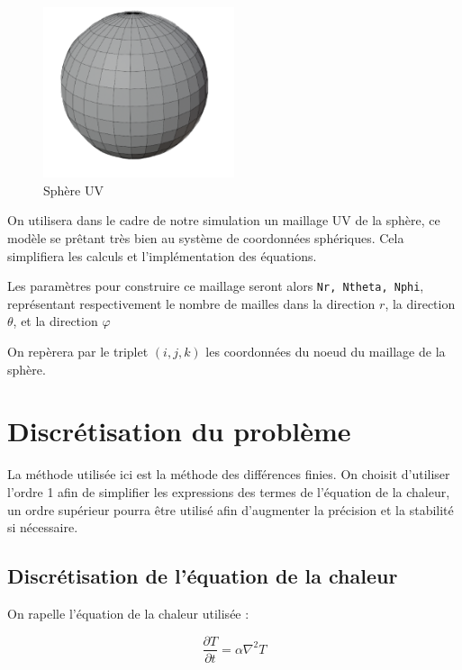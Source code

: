 \documentclass[fleqn]{article}
\renewcommand{\phi}{\varphi}
\begin{document}
\begin{center}
\begin{minipage}[b]{0.33333\textwidth}
\begin{figure}[H]
    \end{figure}
    \end{minipage}%
    \begin{minipage}[b]{0.33333\textwidth}
    \begin{figure}[H]
        \centering
        \includegraphics[width = 0.5\textwidth]{images/sphere UV.png}
        \caption[short]{Sphère UV}
    \end{figure}
    \end{minipage}
\end{center}


On utilisera dans le cadre de notre simulation un maillage UV de la sphère, ce modèle se prêtant très bien au système de coordonnées sphériques. Cela simplifiera les calculs et l'implémentation des équations.

Les paramètres pour construire ce maillage seront alors \texttt{Nr, Ntheta, Nphi}, représentant respectivement le nombre de mailles dans la direction $r$, la direction $\theta$, et la direction $\phi$ 

On repèrera par le triplet $(i,j,k)$ les coordonnées du noeud du maillage de la sphère. 

\newpage
\section{Discrétisation du problème} 
La méthode utilisée ici est la méthode des différences finies. On choisit d'utiliser l'ordre 1 afin de simplifier les expressions des termes de l'équation de la chaleur, un ordre supérieur pourra être utilisé afin d'augmenter la précision et la stabilité si nécessaire.
\subsection{Discrétisation de l'équation de la chaleur}
On rapelle l'équation de la chaleur utilisée :

\begin{equation}
    \frac{ \partial T}{\partial t}  =  \alpha \nabla^2 T
\end{equation}
\end{document}
